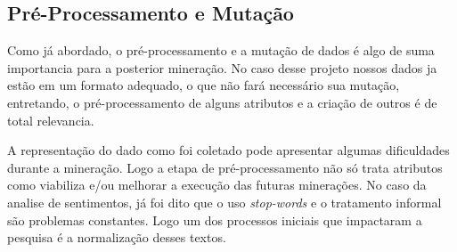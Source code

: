 \subsection{Pré-Processamento e Mutação}
Como já abordado, o pré-processamento e a mutação de dados é algo de suma importancia para a posterior mineração. No caso desse projeto nossos dados ja estão em um formato adequado, o que não fará necessário sua mutação, entretando, o pré-processamento de alguns atributos e a criação de outros é de total relevancia.

A representação do dado como foi coletado pode apresentar algumas dificuldades durante a mineração. Logo a etapa de pré-processamento não só trata atributos como viabiliza e/ou melhorar a execução das futuras minerações. No caso da analise de sentimentos, já foi dito que o uso \textit{stop-words} e o tratamento informal são problemas constantes. Logo um dos processos iniciais que impactaram a pesquisa é a normalização desses textos.
